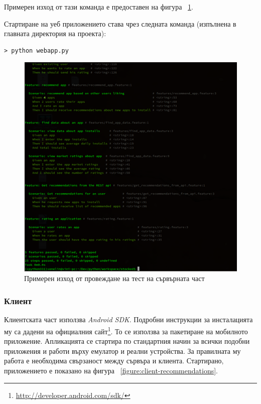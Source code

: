 	Примерен изход от тази команда е предоставен на фигура ~\ref{figure:server-test-output}.
	
	Стартиране на уеб приложението става чрез следната команда (изпълнена в главната директория на проекта):
	\begin{lstlisting}[style=BashStyle]
    > python webapp.py
	\end{lstlisting}		
	
	\begin{figure}[htbp]
		\centering
 		\includegraphics[scale=0.8]{assets/server-test-output.png}
		\caption{Примерен изход от провеждане на тест на сървърната част}
		\label{figure:server-test-output}
	\end{figure}
		
	\subsubsection{Клиент}
	
	Клиентската част използва \emph{Android SDK}. Подробни инструкции за инсталацията му са дадени на официалния сайт\footnote{\url{http://developer.android.com/sdk/}}. То се използва за пакетиране на мобилното приложение. Апликацията се стартира по стандартния начин за всички подобни приложения и работи върху емулатор и реални устройства. За правилната му работа е необходима свързаност между сървъра и клиента. Стартирано, приложението е показано на фигура ~\ref{figure:client-recommendations}.

